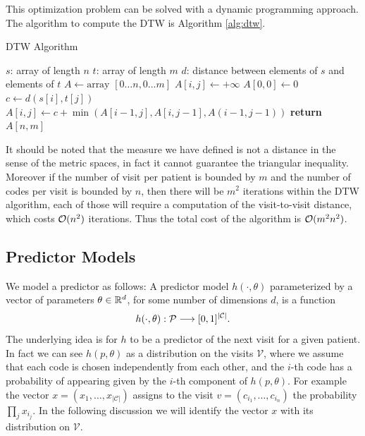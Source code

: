 \documentclass[]{marticle}
\newcommand{\codes}{\mathcal{C}}
\newcommand{\patients}{\mathcal{P}}
\newcommand{\visits}{\mathcal{V}}
\begin{document}
This optimization problem can be solved with a dynamic programming approach. The algorithm to
compute the DTW is Algorithm \ref{alg:dtw}.

\begin{algorithm}[!tb]
\caption{DTW Algorithm}\label{alg:dtw}
\begin{algorithmic}
    \Require $s$: array of length $n$
    \Require $t$: array of length $m$
    \Require $d$: distance between elements of $s$ and elements of $t$
     
        \State $A \gets \text{array $[0\dots n, 0\dots m]$}$
                \State $A[i,j] \gets +\infty$
            \EndFor
        \EndFor
        \State $A[0,0] \gets 0$
        \\
                \State $c \gets d(s[i], t[j])$
                \State $A[i,j] \gets c + \min(A[i-1,j], A[i,j-1], A(i-1,j-1))$
            \EndFor
        \EndFor
        \State \textbf{return} $A[n, m]$
    \EndFunction
\end{algorithmic}
\end{algorithm}

It should be noted that the measure we have defined is not a distance in the sense of the metric
spaces, in fact it cannot guarantee the triangular inequality. Moreover if the number of visit per
patient is bounded by $m$ and the number of codes per visit is bounded by $n$, then there will be
$m^2$ iterations within the DTW algorithm, each of those will require a computation of the
visit-to-visit distance, which costs $\mathcal{O}(n^2)$ iterations. Thus the total cost of the
algorithm is $\mathcal{O}(m^2n^2)$.

\subsection{Predictor Models}

We model a predictor as follows:
A predictor model $h(\cdot, \theta)$ parameterized by a vector of parameters $\theta \in \mathbb{R}^d$, for
some number of dimensions $d$, is a function
$$ h(\cdot, \theta) : \patients \arr [0,1]^{|\codes|}. $$
The underlying idea is for $h$ to be a predictor of the next visit for a given patient. In fact we
can see $h(p, \theta)$ as a distribution on the visits $\visits$, where we assume that each code is
chosen independently from each other, and the $i$-th code has a probability of appearing given by
the $i$-th component of $h(p, \theta)$. For example the vector $x=(x_1, \dots, x_{|\codes|})$ assigns
to the visit $v=(c_{i_1}, \dots, c_{i_n})$ the probability $\prod_j x_{i_j}$. In the following
discussion we will identify the vector $x$ with its distribution on $\visits$.
\end{document}
